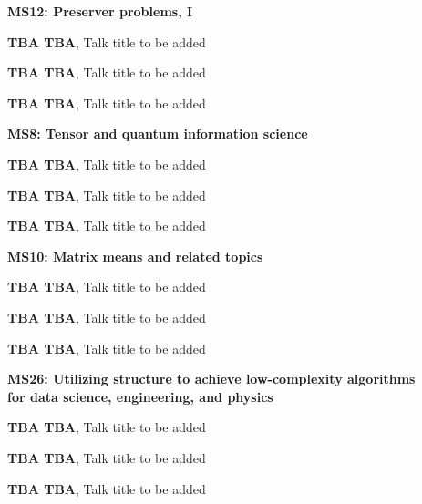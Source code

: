 \documentclass[ILAS2025-program.tex]{subfiles}
\begin{document}
\begin{description}
\begin{description}
        \end{description}
    \begin{description}
    \item[] \textbf{MS12: Preserver problems, I} 
    \item[] \textbf{TBA TBA}, Talk title to be added
        \item[] \textbf{TBA TBA}, Talk title to be added
        \item[] \textbf{TBA TBA}, Talk title to be added
        \end{description}
    \begin{description}
    \item[] \textbf{MS8: Tensor and quantum information science} 
    \item[] \textbf{TBA TBA}, Talk title to be added
        \item[] \textbf{TBA TBA}, Talk title to be added
        \item[] \textbf{TBA TBA}, Talk title to be added
        \end{description}
    \begin{description}
    \item[] \textbf{MS10: Matrix means and related topics} 
    \item[] \textbf{TBA TBA}, Talk title to be added
        \item[] \textbf{TBA TBA}, Talk title to be added
        \item[] \textbf{TBA TBA}, Talk title to be added
        \end{description}
    \begin{description}
    \item[] \textbf{MS26: Utilizing structure to achieve low-complexity algorithms for data science, engineering, and physics} 
    \item[] \textbf{TBA TBA}, Talk title to be added
        \item[] \textbf{TBA TBA}, Talk title to be added
        \item[] \textbf{TBA TBA}, Talk title to be added
        \end{description}
    \begin{description}

\end{description}
\end{description}
\end{document}
